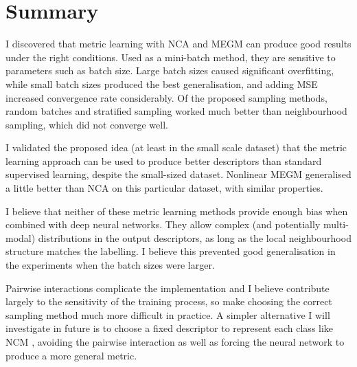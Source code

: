 \section {Summary}

I discovered that metric learning with \gls{NCA} and \gls{MEGM} can produce good results under the right conditions. Used as a mini-batch method, they are sensitive to parameters such as batch size. Large batch sizes caused significant overfitting, while small batch sizes produced the best generalisation, and adding \gls{MSE} increased convergence rate considerably. Of the proposed sampling methods, random batches and stratified sampling worked much better than neighbourhood sampling, which did not converge well.


I validated the proposed idea (at least in the small scale dataset) that the metric learning approach can be used to produce better descriptors than
standard supervised learning, despite the small-sized dataset. Nonlinear \gls{MEGM} generalised a little better than NCA on this particular dataset, with similar
properties.

I believe that neither of these metric learning methods provide enough bias when combined with deep neural networks. They allow
complex (and potentially multi-modal) distributions in the output descriptors, as long as the local neighbourhood structure matches the labelling. I believe this prevented good generalisation in the experiments when the batch sizes were larger.

Pairwise interactions complicate the implementation and I believe contribute largely to the sensitivity of the training process, so make choosing the correct sampling method much more difficult in practice. A simpler alternative I will investigate in future is to choose a fixed descriptor to represent each class like \gls{NCM} \cite {Mensink2012}, avoiding the pairwise interaction as well as forcing the neural network to produce a more general metric.

 



